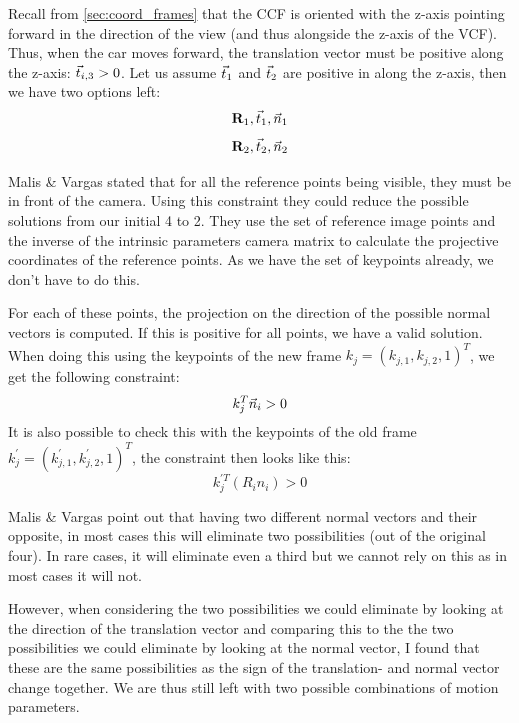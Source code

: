 Recall from \autoref{sec:coord_frames} that the CCF is oriented with the z-axis pointing forward in the direction of the view (and thus alongside the z-axis of the VCF). Thus, when the car moves forward, the translation vector must be positive along the z-axis: $\vec t_{i,3} > 0$. Let us assume $\vec t_1$ and $\vec t_2$ are positive in along the z-axis, then we have two options left:
\begin{equation*}
    \mathbf{R}_1, \vec t_1, \vec n_1
\end{equation*}
\begin{equation*}
    \mathbf{R}_2, \vec t_2, \vec n_2
\end{equation*}

Malis \& Vargas \cite{homography-decomposition} stated that for all the reference points being visible, they must be in front of the camera. Using this constraint they could reduce the possible solutions from our initial 4 to 2. They use the set of reference image points and the inverse of the intrinsic parameters camera matrix to calculate the projective coordinates of the reference points. As we have the set of keypoints already, we don't have to do this.\bigskip

For each of these points, the projection on the direction of the possible normal vectors is computed. If this is positive for all points, we have a valid solution. When doing this using the keypoints of the new frame $k_j = (k_{j, 1}, k_{j, 2}, 1)^T$, we get the following constraint:
\begin{equation}
    k_j^T\vec n_i > 0
\end{equation}
It is also possible to check this with the keypoints of the old frame $k^{'}_j = (k^{'}_{j, 1}, k^{'}_{j, 2}, 1)^T$, the constraint then looks like this:
\begin{equation}
    k^{'T}_j (R_{i}n_i) > 0
\end{equation}

Malis \& Vargas point out that having two different normal vectors and their opposite, in most cases this will  eliminate two possibilities (out of the original four). In rare cases, it will eliminate even a third but we cannot rely on this as in most cases it will not. \bigskip

However, when considering the two possibilities we could eliminate by looking at the direction of the translation vector and comparing this to the the two possibilities we could eliminate by looking at the normal vector, I found that these are the same possibilities as the sign of the translation- and normal vector change together. We are thus still left with two possible combinations of motion parameters. 

